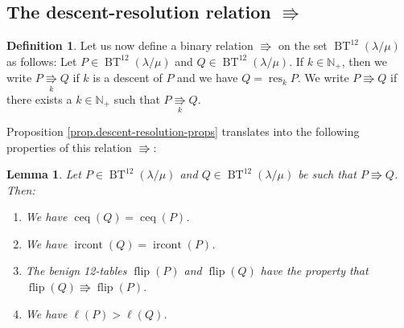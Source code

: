 \documentclass[12pt]{article}
\theoremstyle{plain}
\newtheorem{lemma}[theorem]{Lemma}
\theoremstyle{definition}
\newtheorem{definition}[theorem]{Definition}
\def\BenignTables{{\operatorname{BT}^{12}\left(  \lambda/\mu\right)}}
\begin{document}

\subsection{The descent-resolution relation $\Rrightarrow$}

\begin{definition}
Let us now define a binary relation $\Rrightarrow$ on the set $\BenignTables$ as
follows: Let $P\in\BenignTables$ and $Q\in\BenignTables$. If $k\in\mathbb{N}_{+}$,
then we write $P\underset{k}{\Rrightarrow}Q$ if $k$ is a descent
of $P$ and we have $Q=\operatorname*{res}\nolimits_{k}P$. We write $P\Rrightarrow Q$ if there
exists a $k\in\mathbb{N}_{+}$ such that $P\underset{k}{\Rrightarrow}Q$.
\end{definition}

Proposition \ref{prop.descent-resolution-props} translates into the following properties of this relation
$\Rrightarrow$:

\begin{lemma}
\label{lem.descent-resolution-props}Let $P\in\BenignTables$ and $Q\in\BenignTables$
be such that $P\Rrightarrow Q$. Then:

\begin{enumerate}
\item[\textbf{(a)}] We have $\operatorname*{ceq}\left(  Q\right)
=\operatorname*{ceq}\left(  P\right)  $.

\item[\textbf{(b)}] We have $\operatorname*{ircont}\left(  Q\right)
=\operatorname*{ircont}\left(  P\right)  $.

\item[\textbf{(c)}] The benign 12-tables $\operatorname*{flip}\left(  P\right)  $ and
$\operatorname*{flip}\left(  Q\right)  $ have the property that
$\operatorname*{flip}\left(  Q\right)  \Rrightarrow\operatorname*{flip}\left(
P\right)  $.

\item[\textbf{(d)}] We have $\ell\left(  P\right)  >\ell\left(  Q\right)  $.

\end{enumerate}
\end{lemma}
\end{document}
